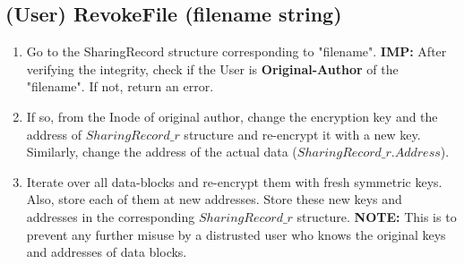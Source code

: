 \documentclass[a4paper, 12pt]{scrartcl}
\begin{document}
\subsection{(User) RevokeFile (filename string)}
\begin{enumerate}
	\itemsep0em
	\item Go to the SharingRecord structure corresponding to "filename". \textbf{IMP:} After verifying the integrity, check if the User is \textbf{Original-Author} of the "filename". If not, return an error.
	\item If so, from the Inode of original author, change the encryption key and the address of $SharingRecord\_r$ structure and re-encrypt it with a new key. Similarly, change the address of the actual data ($SharingRecord\_r.Address$).
	\item Iterate over all data-blocks and re-encrypt them with fresh symmetric keys. Also, store each of them at new addresses. Store these new keys and addresses in the corresponding $SharingRecord\_r$ structure. \textbf{NOTE:} This is to prevent any further misuse by a distrusted user who knows the original keys and addresses of data blocks.
\end{enumerate}
\end{document}
